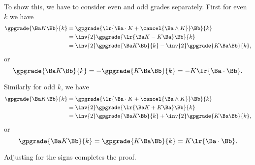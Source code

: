 To show this, we have to consider even and odd grades separately.  First for even \(k\) we have
\begin{equation}\label{eqn:stokesTheoremGeometricAlgebra:4710}
\begin{aligned}
\gpgrade{ \Ba K \Bb }{k}
&=
\gpgrade{ \lr{ \Ba \cdot K + \cancel{\Ba \wedge K}} \Bb }{k} \\
&=
\inv{2} \gpgrade{ \lr{ \Ba K - K \Ba } \Bb }{k} \\
&=
\inv{2} \gpgrade{ \Ba K \Bb }{k}
-\inv{2} \gpgrade{ K \Ba \Bb }{k},
\end{aligned}
\end{equation}
or
\begin{equation}\label{eqn:stokesTheoremGeometricAlgebra:4730}
\gpgrade{ \Ba K \Bb }{k} = -\gpgrade{ K \Ba \Bb }{k} = -K \lr{ \Ba \cdot \Bb}.
\end{equation}

Similarly for odd \(k\), we have
\begin{equation}\label{eqn:stokesTheoremGeometricAlgebra:4790}
\begin{aligned}
\gpgrade{ \Ba K \Bb }{k}
&=
\gpgrade{ \lr{ \Ba \cdot K + \cancel{\Ba \wedge K}} \Bb }{k} \\
&=
\inv{2} \gpgrade{ \lr{ \Ba K + K \Ba } \Bb }{k} \\
&=
\inv{2} \gpgrade{ \Ba K \Bb }{k}
+\inv{2} \gpgrade{ K \Ba \Bb }{k},
\end{aligned}
\end{equation}
or
\begin{equation}\label{eqn:stokesTheoremGeometricAlgebra:5310}
\gpgrade{ \Ba K \Bb }{k} = \gpgrade{ K \Ba \Bb }{k} = K \lr{ \Ba \cdot \Bb}.
\end{equation}

Adjusting for the signs completes the proof.
